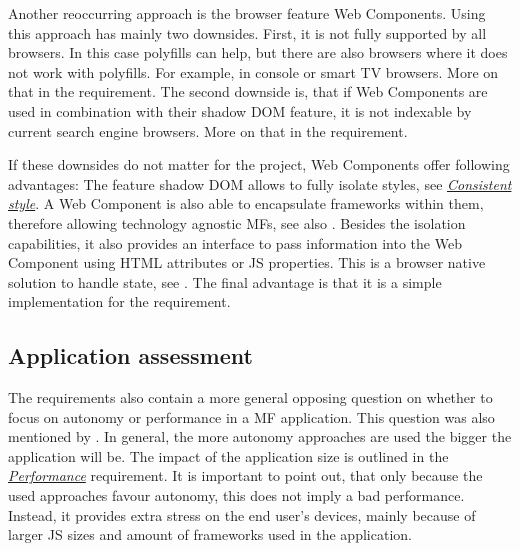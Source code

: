Another reoccurring approach is the browser feature Web Components.
Using this approach has mainly two downsides.
First, it is not fully supported by all browsers.
In this case polyfills can help, but there are also browsers where it does not work with polyfills.
For example, in console or smart TV browsers.
More on that in the \textit{} requirement.
The second downside is, that if Web Components are used in combination with their shadow \ac{DOM} feature, it is not indexable by current search engine browsers.
More on that in the \textit{} requirement.

If these downsides do not matter for the project, Web Components offer following advantages:
The feature shadow \ac{DOM} allows to fully isolate styles, see \textit{\hyperref[cha:requirement_detail_style]{Consistent style}}.
A Web Component is also able to encapsulate frameworks within them, therefore allowing technology agnostic \acp{MF}, see also \textit{}.
Besides the isolation capabilities, it also provides an interface to pass information into the Web Component using \ac{HTML} attributes or \ac{JS} properties.
This is a browser native solution to handle state, see \textit{}.
The final advantage is that it is a simple implementation for the \textit{} requirement.





\subsection{Application assessment}\label{cha:requirements_conclusion_application}

The requirements also contain a more general opposing question on whether to focus on autonomy or performance in a \ac{MF} application.
This question was also mentioned by \textciteSteyer{}.
In general, the more autonomy approaches are used the bigger the application will be.
The impact of the application size is outlined in the \textit{\hyperref[cha:requirement_detail_performance]{Performance}} requirement.
It is important to point out, that only because the used approaches favour autonomy, this does not imply a bad performance.
Instead, it provides extra stress on the end user's devices, mainly because of larger \ac{JS} sizes and amount of frameworks used in the application.

